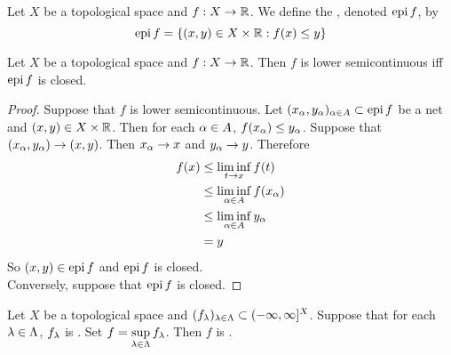 \documentclass{book}
\begin{document}
	\begin{defn}
		Let $X$ be a topological space and $f: X \rightarrow \mathbb{R}$. We define the , denoted $\operatorname{epi} f$, by 
		$$\operatorname{epi} f = \{(x, y) \in X \times \mathbb{R}: f(x) \leq y\}$$
	\end{defn}

	\begin{ex}
		Let $X$ be a topological space and $f: X \rightarrow \mathbb{R}$. Then $f$ is lower semicontinuous iff $\operatorname{epi} f$ is closed.
	\end{ex}

	\begin{proof}
		Suppose that $f$ is lower semicontinuous. Let $(x_{\alpha}, y_{\alpha})_{\alpha \in A} \subset \operatorname{epi} f$ be a net and $(x, y) \in X \times \mathbb{R}$. Then for each $\alpha \in A$, $f(x_{\alpha}) \leq y_{\alpha}$. Suppose that $(x_{\alpha}, y_{\alpha}) \rightarrow (x, y)$. Then $x_{\alpha} \rightarrow x$ and $y_{\alpha} \rightarrow y$. Therefore 
		\begin{align*}
			f(x) 
			& \leq \liminf_{t \rightarrow x} f(t) \\
			& \leq \liminf_{\alpha \in A} f(x_{\alpha}) \\
			& \leq \liminf_{\alpha \in A} y_{\alpha} \\
			&= y 
		\end{align*}
	So $(x, y) \in \operatorname{epi} f$ and $\operatorname{epi} f$ is closed. \\
	Conversely, suppose that $\operatorname{epi} f$ is closed. 
	\end{proof}

	\begin{ex}
		Let $X$ be a topological space and $ (f_{\lambda})_{\lambda \in \Lambda} \subset (-\infty, \infty]^X$. Suppose that for each $\lambda \in \Lambda$, $f_\lambda$ is \lsc. Set $f = \sup\limits_{\lambda \in \Lambda} f_{\lambda}$. Then $f$ is \lsc.
	\end{ex}
\end{document}
